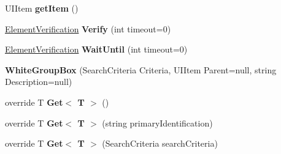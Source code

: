\begin{DoxyCompactItemize}
\item 
\hypertarget{class_proto_test_1_1_golem_1_1_white_1_1_elements_1_1_white_group_box_a839ff791b1181ee8c186da2831a12d99}{U\-I\-Item {\bfseries get\-Item} ()}\label{class_proto_test_1_1_golem_1_1_white_1_1_elements_1_1_white_group_box_a839ff791b1181ee8c186da2831a12d99}

\item 
\hypertarget{class_proto_test_1_1_golem_1_1_white_1_1_elements_1_1_white_group_box_ab60840834b8fb18ba838498f00d163a7}{\hyperlink{class_proto_test_1_1_golem_1_1_white_1_1_element_verification}{Element\-Verification} {\bfseries Verify} (int timeout=0)}\label{class_proto_test_1_1_golem_1_1_white_1_1_elements_1_1_white_group_box_ab60840834b8fb18ba838498f00d163a7}

\item 
\hypertarget{class_proto_test_1_1_golem_1_1_white_1_1_elements_1_1_white_group_box_a58fb6e174a33ed115e3f009897e798c3}{\hyperlink{class_proto_test_1_1_golem_1_1_white_1_1_element_verification}{Element\-Verification} {\bfseries Wait\-Until} (int timeout=0)}\label{class_proto_test_1_1_golem_1_1_white_1_1_elements_1_1_white_group_box_a58fb6e174a33ed115e3f009897e798c3}

\item 
\hypertarget{class_proto_test_1_1_golem_1_1_white_1_1_elements_1_1_white_group_box_abba299604614e7a399cf7e1cd4467c19}{{\bfseries White\-Group\-Box} (Search\-Criteria Criteria, U\-I\-Item Parent=null, string Description=null)}\label{class_proto_test_1_1_golem_1_1_white_1_1_elements_1_1_white_group_box_abba299604614e7a399cf7e1cd4467c19}

\item 
\hypertarget{class_proto_test_1_1_golem_1_1_white_1_1_elements_1_1_white_group_box_a0f3306836f3e9589dfbf50c902b64928}{override T {\bfseries Get$<$ T $>$} ()}\label{class_proto_test_1_1_golem_1_1_white_1_1_elements_1_1_white_group_box_a0f3306836f3e9589dfbf50c902b64928}

\item 
\hypertarget{class_proto_test_1_1_golem_1_1_white_1_1_elements_1_1_white_group_box_ab8d6ad9e9d0dfddfa111b13d6f862ac0}{override T {\bfseries Get$<$ T $>$} (string primary\-Identification)}\label{class_proto_test_1_1_golem_1_1_white_1_1_elements_1_1_white_group_box_ab8d6ad9e9d0dfddfa111b13d6f862ac0}

\item 
\hypertarget{class_proto_test_1_1_golem_1_1_white_1_1_elements_1_1_white_group_box_a545f555063bb233965f0008ecb1e253e}{override T {\bfseries Get$<$ T $>$} (Search\-Criteria search\-Criteria)}\label{class_proto_test_1_1_golem_1_1_white_1_1_elements_1_1_white_group_box_a545f555063bb233965f0008ecb1e253e}


\end{DoxyCompactItemize}
